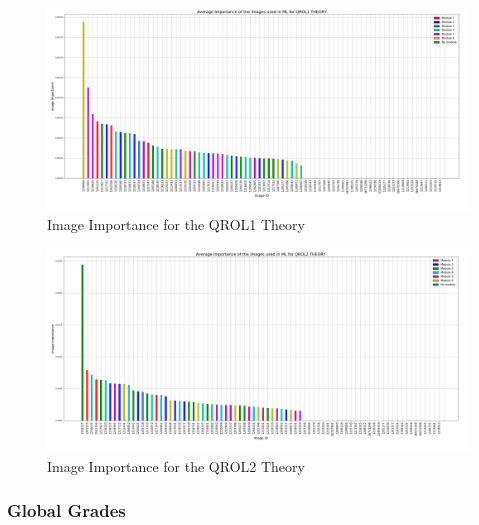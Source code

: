 \documentclass[a4paper,11pt]{report}
\numberwithin{figure}{section} %
\begin{document}
      \begin{figure}[H]
      \centering
      \includegraphics[width=.95\linewidth]{im_importance_QROL1_THEORY_2018-05-02_20_54_25.png}
      \caption{Image Importance for the QROL1 Theory}
      \label{fig:im_th2}
      \end{figure}
      
      \begin{figure}[H]
      \centering
      \includegraphics[width=.95\linewidth]{im_importance_QROL2_THEORY_2018-05-02_20_53_48.png}
      \caption{Image Importance for the QROL2 Theory}
      \label{fig:im_th3}
      \end{figure}    


    \subsubsection{Global Grades}
    
\end{document}
